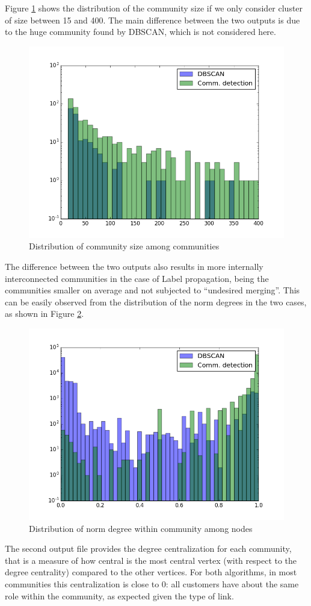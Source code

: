 \documentclass[a4paper,11pt]{book}
\begin{document}
Figure \ref{fig:nnodes1} shows the distribution of the community size if we only consider cluster of size between 15 and 400. The main difference between the two outputs is due to the huge community found by DBSCAN, which is not considered here.
\begin{figure}[H]
\centering
\includegraphics[height=7.25 cm,width=10 cm]{plot_nnodes_broker.png}
\caption{Distribution of community size among communities}\label{fig:nnodes1}
\end{figure}
The difference between the two outputs also results in more internally interconnected communities in the case of Label propagation, being the communities smaller on average and not subjected to ``undesired merging''. This can be easily observed from the distribution of the norm degrees in the two cases, as shown in Figure \ref{fig:ndegree1}.
  \begin{figure}[H]
\centering
\includegraphics[height=7.25 cm,width=10 cm]{plot_net_ndegree_broker.png}
\caption{Distribution of norm degree within community among nodes}\label{fig:ndegree1}
\end{figure}
The second output file provides the degree centralization for each community, that is a measure of how central is the most central vertex (with respect to the degree centrality) compared to the other vertices. For both algorithms, in most communities this centralization is close to 0: all customers have about the same role within the community, as expected given the type of link.
\end{document}
